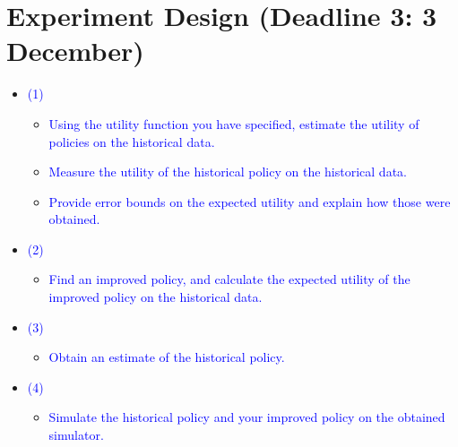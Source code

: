 
\section*{Experiment Design (Deadline 3: 3 December)}
\begin{itemize}
    \item \textcolor{blue}{(1)}
        \begin{itemize}
            \item \textcolor{blue}{Using the utility function you have specified, estimate the utility of policies on the historical data.}
            \item \textcolor{blue}{Measure the utility of the historical policy on the historical data.}
            \item \textcolor{blue}{Provide error bounds on the expected utility and explain how those were obtained.}
        \end{itemize}
    \item \textcolor{blue}{(2)}
        \begin{itemize}
            \item \textcolor{blue}{Find an improved policy, and calculate the expected utility of the improved policy on the historical data.}
        \end{itemize}
    \item \textcolor{blue}{(3)}
        \begin{itemize}
            \item \textcolor{blue}{Obtain an estimate of the historical policy.}
        \end{itemize}
    \item \textcolor{blue}{(4)}
        \begin{itemize}
            \item \textcolor{blue}{Simulate the historical policy and your improved policy on the obtained simulator.}
        \end{itemize}
\end{itemize}